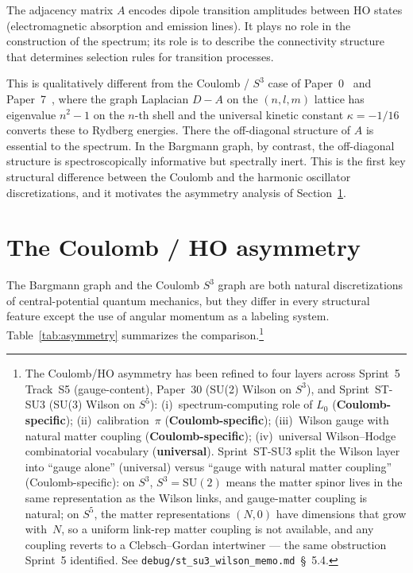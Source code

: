 \documentclass[twocolumn,pra,amsmath,amssymb,superscriptaddress]{revtex4-2}
\begin{document}
The adjacency matrix $A$ encodes dipole transition amplitudes
between HO states (electromagnetic absorption and emission lines).
It plays no role in the construction of the spectrum; its role is
to describe the connectivity structure that determines selection
rules for transition processes.

This is qualitatively different from the Coulomb / $S^3$ case of
Paper~0~\cite{paper0} and Paper~7~\cite{paper7}, where the graph
Laplacian $D - A$ on the $(n, l, m)$ lattice has eigenvalue $n^2 -
1$ on the $n$-th shell and the universal kinetic constant $\kappa
= -1/16$ converts these to Rydberg energies.  There the
off-diagonal structure of $A$ is essential to the spectrum.  In the
Bargmann graph, by contrast, the off-diagonal structure is
spectroscopically informative but spectrally inert.  This is the
first key structural difference between the Coulomb and the
harmonic oscillator discretizations, and it motivates the
asymmetry analysis of Section~\ref{sec:asymmetry}.

\section{The Coulomb / HO asymmetry}
\label{sec:asymmetry}

The Bargmann graph and the Coulomb $S^3$ graph are both natural
discretizations of central-potential quantum mechanics, but they
differ in every structural feature except the use of angular
momentum as a labeling system.  Table~\ref{tab:asymmetry}
summarizes the comparison.\footnote{The Coulomb/HO asymmetry has been
refined to four layers across Sprint~5 Track~S5 (gauge-content),
Paper~30 (SU(2) Wilson on $S^3$), and Sprint~ST-SU3 (SU(3) Wilson on
$S^5$): (i)~spectrum-computing role of $L_0$
(\textbf{Coulomb-specific}); (ii)~calibration~$\pi$
(\textbf{Coulomb-specific}); (iii)~Wilson gauge with natural matter
coupling (\textbf{Coulomb-specific}); (iv)~universal Wilson--Hodge
combinatorial vocabulary (\textbf{universal}).  Sprint~ST-SU3 split
the Wilson layer into ``gauge alone'' (universal) versus ``gauge
with natural matter coupling'' (Coulomb-specific): on $S^3$,
$S^3 = \mathrm{SU}(2)$ means the matter spinor lives in the same
representation as the Wilson links, and gauge-matter coupling is
natural; on $S^5$, the matter representations $(N, 0)$ have
dimensions that grow with~$N$, so a uniform link-rep matter coupling
is not available, and any coupling reverts to a Clebsch--Gordan
intertwiner --- the same obstruction Sprint~5 identified.  See
\texttt{debug/st\_su3\_wilson\_memo.md}~\S~5.4.}
\end{document}
